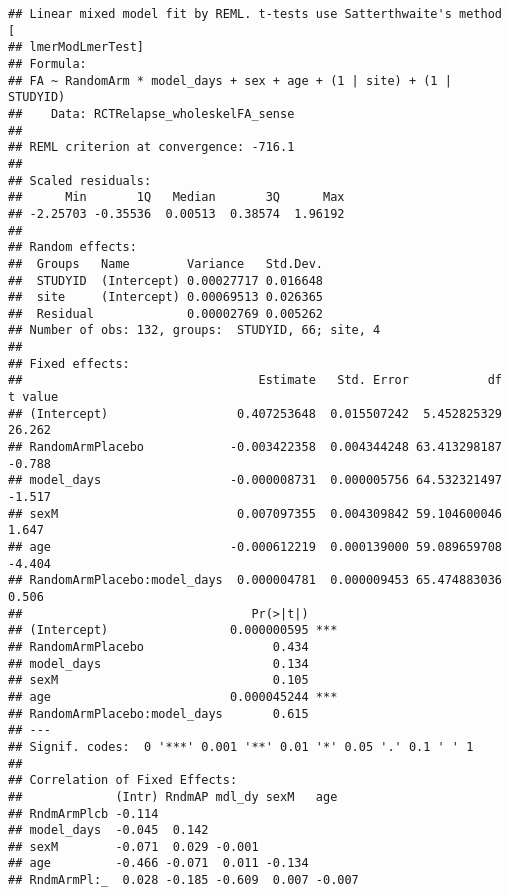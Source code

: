 \documentclass[]{article}
\newenvironment{Shaded}{\begin{snugshade}}{\end{snugshade}}
\newcommand{\KeywordTok}[1]{\textcolor[rgb]{0.13,0.29,0.53}{\textbf{#1}}}
\newcommand{\DataTypeTok}[1]{\textcolor[rgb]{0.13,0.29,0.53}{#1}}
\newcommand{\DecValTok}[1]{\textcolor[rgb]{0.00,0.00,0.81}{#1}}
\newcommand{\StringTok}[1]{\textcolor[rgb]{0.31,0.60,0.02}{#1}}
\newcommand{\CommentTok}[1]{\textcolor[rgb]{0.56,0.35,0.01}{\textit{#1}}}
\newcommand{\OperatorTok}[1]{\textcolor[rgb]{0.81,0.36,0.00}{\textbf{#1}}}
\newcommand{\NormalTok}[1]{#1}
\theoremstyle{definition}
\theoremstyle{definition}
\theoremstyle{definition}
\theoremstyle{remark}
\begin{document}
\begin{Shaded}
\end{Shaded}

\begin{verbatim}
## Linear mixed model fit by REML. t-tests use Satterthwaite's method [
## lmerModLmerTest]
## Formula: 
## FA ~ RandomArm * model_days + sex + age + (1 | site) + (1 | STUDYID)
##    Data: RCTRelapse_wholeskelFA_sense
## 
## REML criterion at convergence: -716.1
## 
## Scaled residuals: 
##      Min       1Q   Median       3Q      Max 
## -2.25703 -0.35536  0.00513  0.38574  1.96192 
## 
## Random effects:
##  Groups   Name        Variance   Std.Dev.
##  STUDYID  (Intercept) 0.00027717 0.016648
##  site     (Intercept) 0.00069513 0.026365
##  Residual             0.00002769 0.005262
## Number of obs: 132, groups:  STUDYID, 66; site, 4
## 
## Fixed effects:
##                                 Estimate   Std. Error           df t value
## (Intercept)                  0.407253648  0.015507242  5.452825329  26.262
## RandomArmPlacebo            -0.003422358  0.004344248 63.413298187  -0.788
## model_days                  -0.000008731  0.000005756 64.532321497  -1.517
## sexM                         0.007097355  0.004309842 59.104600046   1.647
## age                         -0.000612219  0.000139000 59.089659708  -4.404
## RandomArmPlacebo:model_days  0.000004781  0.000009453 65.474883036   0.506
##                                Pr(>|t|)    
## (Intercept)                 0.000000595 ***
## RandomArmPlacebo                  0.434    
## model_days                        0.134    
## sexM                              0.105    
## age                         0.000045244 ***
## RandomArmPlacebo:model_days       0.615    
## ---
## Signif. codes:  0 '***' 0.001 '**' 0.01 '*' 0.05 '.' 0.1 ' ' 1
## 
## Correlation of Fixed Effects:
##             (Intr) RndmAP mdl_dy sexM   age   
## RndmArmPlcb -0.114                            
## model_days  -0.045  0.142                     
## sexM        -0.071  0.029 -0.001              
## age         -0.466 -0.071  0.011 -0.134       
## RndmArmPl:_  0.028 -0.185 -0.609  0.007 -0.007
\end{verbatim}
\end{document}
